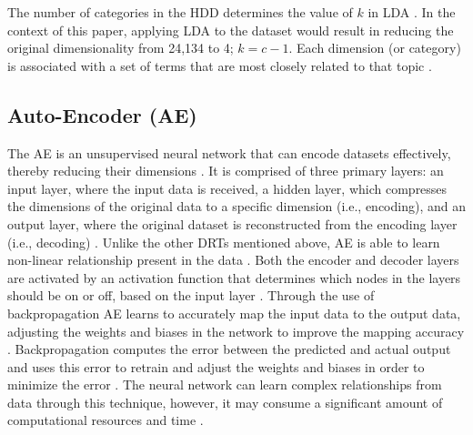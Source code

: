 \documentclass[12pt]{article}
\begin{document}
The number of categories in the HDD determines the value of $k$ in LDA \parencite{hastie_friedman_tisbshirani_2017}. In the context of this paper, applying LDA to the dataset would result in reducing the original dimensionality from 24,134 to 4; $ k=c-1$. Each dimension (or category) is associated with a set of terms that are most closely related to that topic \parencite{hastie_friedman_tisbshirani_2017}.

\subsection{Auto-Encoder (AE)}
\hspace{\parindent} The AE is an unsupervised neural network that can encode datasets effectively, thereby reducing their dimensions \parencite{8780129}. It is comprised of three primary layers: an input layer, where the input data is received, a hidden layer, which compresses the dimensions of the original data to a specific dimension (i.e., encoding), and an output layer, where the original dataset is reconstructed from the encoding layer (i.e., decoding) \parencite{8780129}. Unlike the other DRTs mentioned above, AE is able to learn non-linear relationship present in the data \parencite{8780129}. Both the encoder and decoder layers are activated by an activation function that determines which nodes in the layers should be on or off, based on the input layer \parencite{hastie_friedman_tisbshirani_2017_nn}. Through the use of backpropagation AE learns to accurately map the input data to the output data, adjusting the weights and biases in the network to improve the mapping accuracy \parencite{hastie_friedman_tisbshirani_2017_nn}. Backpropagation computes the error between the predicted and actual output and uses this error to retrain and adjust the weights and biases in order to minimize the error \parencite{hastie_friedman_tisbshirani_2017_nn}. The neural network can learn complex relationships from data through this technique, however, it may consume a significant amount of computational resources and time \parencite{hastie_friedman_tisbshirani_2017_nn}.

\begin{center}
\end{center}
\end{document}

